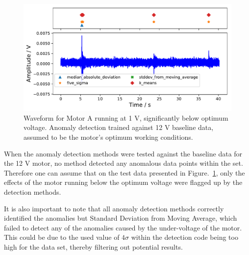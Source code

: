 
\begin{figure}[t]
    \includegraphics[width=1.0\textwidth]{fig/large_1V_nowater_large_12V.pdf}
    \caption[Undervoltage of Large Motor]{Waveform for Motor A running at 1 V, significantly below optimum voltage. Anomaly detection trained against 12 V baseline data, assumed to be the motor's optimum working conditions.}
    \label{fig:largemotor_1V}
\end{figure}

When the anomaly detection methods were tested against the baseline data for the 12 V motor, no method detected any anomalous data points within the set. Therefore one can assume that on the test data presented in Figure.~\ref{fig:largemotor_1V}, only the effects of the motor running below the optimum voltage were flagged up by the detection methods. 

It is also important to note that all anomaly detection methods correctly identified the anomalies but Standard Deviation from Moving Average, which failed to detect any of the anomalies caused by the under-voltage of the motor. This could be due to the used value of $4\sigma$ within the detection code being too high for the data set, thereby filtering out potential results.

